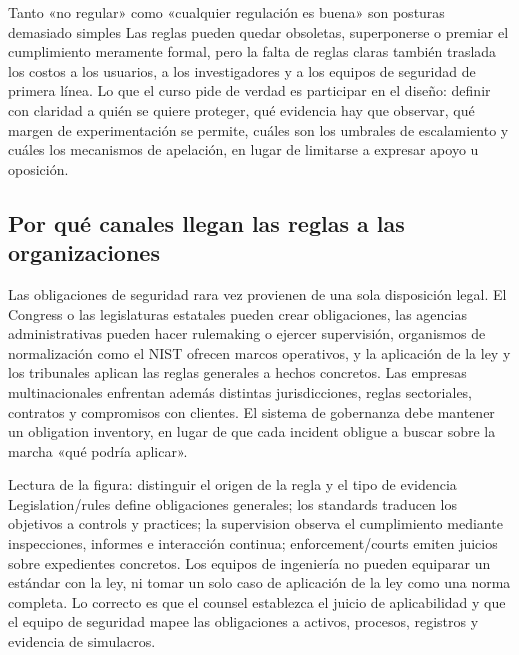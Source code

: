 \begin{warningbox}{Tanto «no regular» como «cualquier regulación es buena» son posturas demasiado simples}
Las reglas pueden quedar obsoletas, superponerse o premiar el cumplimiento meramente formal, pero la falta de reglas claras también traslada los costos a los usuarios, a los investigadores y a los equipos de seguridad de primera línea. Lo que el curso pide de verdad es participar en el diseño: definir con claridad a quién se quiere proteger, qué evidencia hay que observar, qué margen de experimentación se permite, cuáles son los umbrales de escalamiento y cuáles los mecanismos de apelación, en lugar de limitarse a expresar apoyo u oposición.
\end{warningbox}


\subsection{Por qué canales llegan las reglas a las organizaciones}

Las obligaciones de seguridad rara vez provienen de una sola disposición legal. El Congress o las legislaturas estatales pueden crear obligaciones, las agencias administrativas pueden hacer rulemaking o ejercer supervisión, organismos de normalización como el NIST ofrecen marcos operativos, y la aplicación de la ley y los tribunales aplican las reglas generales a hechos concretos. Las empresas multinacionales enfrentan además distintas jurisdicciones, reglas sectoriales, contratos y compromisos con clientes. El sistema de gobernanza debe mantener un obligation inventory, en lugar de que cada incident obligue a buscar sobre la marcha «qué podría aplicar».


\begin{knowledgebox}{Lectura de la figura: distinguir el origen de la regla y el tipo de evidencia}
Legislation/rules define obligaciones generales; los standards traducen los objetivos a controls y practices; la supervision observa el cumplimiento mediante inspecciones, informes e interacción continua; enforcement/courts emiten juicios sobre expedientes concretos. Los equipos de ingeniería no pueden equiparar un estándar con la ley, ni tomar un solo caso de aplicación de la ley como una norma completa. Lo correcto es que el counsel establezca el juicio de aplicabilidad y que el equipo de seguridad mapee las obligaciones a activos, procesos, registros y evidencia de simulacros.
\end{knowledgebox}

